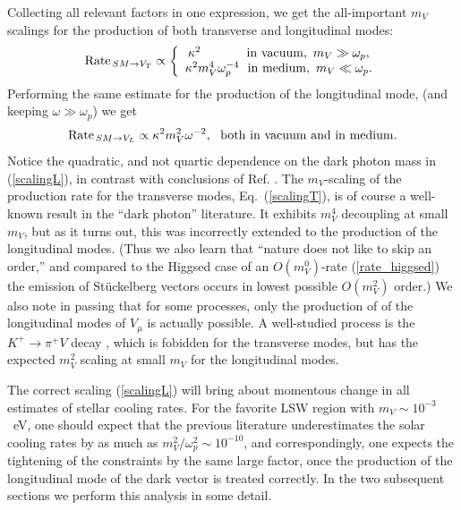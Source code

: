 \documentclass[12pt]{article}
\begin{document}
Collecting all relevant factors in one expression, 
we get the all-important $m_V$ scalings for the production of both transverse and longitudinal 
modes:
\begin{eqnarray}
\label{scalingT}
{\rm Rate}_{\,SM\to V_T} \propto \left\{\begin{array}{c}
\kappa^2  ~~~~~~~~~~~ {\rm in~vacuum}, ~ m_V\gg \omega_p,  \\
\kappa^2 m_V^4\omega_p^{-4} ~~ {\rm in ~medium}, ~ m_V\ll \omega_p.
\end{array}
\right.
\end{eqnarray}
Performing the same estimate for the production of the longitudinal mode, (and keeping 
$\omega \gg \omega_p$) we get
\begin{equation}
\label{scalingL}
{\rm Rate}_{\,SM\to V_L} \propto  \kappa^2 m_V^2 \omega^{-2} ,~~{\rm both~in~vacuum~and~in~medium}.
\end{equation}
Notice the quadratic, and not quartic dependence on the dark photon
mass in (\ref{scalingL}), in contrast with conclusions of
Ref. \cite{Redondo:2008aa}.  The $m_V$-scaling of the production rate
for the transverse modes, Eq.~(\ref{scalingT}), is of course a
well-known result in the ``dark photon'' literature. It exhibits $m_V^4$
decoupling at small $m_V$, but as it turns out, this was incorrectly
extended to the production of the longitudinal modes.  (Thus we also learn
that ``nature does not like to skip an order,'' and compared to
the Higgsed case of an $O(m_V^0)$-rate (\ref{rate_higgsed}) the
emission of St\"uckelberg vectors occurs in lowest possible $O(m_V^2)$
order.)  We also note in passing that for some processes, only the
production of of the longitudinal modes of $V_\mu$ is actually
possible.  A well-studied process is the $K^+\to \pi^+ V$ decay
\cite{Pospelov:2008zw}, which is fobidden for the transverse modes,
but has the expected $m_V^2$ scaling at small $m_V$ for the
longitudinal modes.

The correct scaling (\ref{scalingL}) will bring about momentous change
in all estimates of stellar cooling rates.  For the favorite LSW
region with $m_V \sim 10^{-3}$~eV, one should expect that the previous
literature underestimates the solar cooling rates by as much as
$m_V^2/\omega_p^2 \sim 10^{-10}$, and correspondingly, one expects the
tightening of the constraints by the same large factor, once the
production of the longitudinal mode of the dark vector is treated
correctly. In the two subsequent sections we perform this analysis in
some detail.
\end{document}
